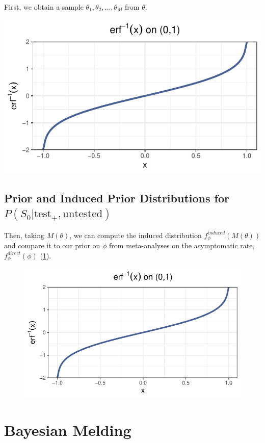 \documentclass[12pt,twoside]{smiththesis}
\begin{document}
First, we obtain a sample \(\theta_1, \theta_2, \dots, \theta_M\) from \(\theta\).

\includegraphics{thesis_files/figure-latex/unnamed-chunk-7-1.pdf}

\hypertarget{prior-and-induced-prior-distributions-for-ps_0texttest_textuntested}{%
\subsection{\texorpdfstring{Prior and Induced Prior Distributions for \(P(S_0|\text{test}_+,\text{untested})\)}{Prior and Induced Prior Distributions for P(S\_0\textbar\textbackslash text\{test\}\_+,\textbackslash text\{untested\})}}\label{prior-and-induced-prior-distributions-for-ps_0texttest_textuntested}}

Then, taking \(M(\theta)\), we can compute the induced distribution \(f_\phi^{induced}(M(\theta))\) and compare it to our prior on \(\phi\) from meta-analyses on the asymptomatic rate, \(f_\phi^{direct}(\phi)\) (\ref{fig:prior-induced}).
\begin{figure}
\centering
\includegraphics{thesis_files/figure-latex/unnamed-chunk-8-1.pdf}
\caption{\label{fig:unnamed-chunk-8}\label{fig:prior-induced}}
\end{figure}
\hypertarget{bayesian-melding}{%
\section{Bayesian Melding}\label{bayesian-melding}}
\end{document}
